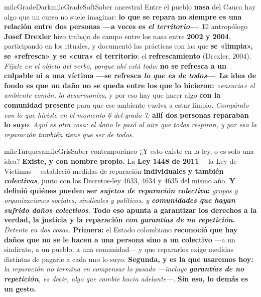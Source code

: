 \documentclass[11pt,letterpaper]{article}
\begin{document}
\begin{softbox}{milcGradeDark}{milcGradeSoft}{Saber ancestral}
Entre el pueblo \textbf{nasa} del Cauca hay algo que un curso no suele imaginar: \textbf{lo que se repara no siempre es una relación entre dos personas ---a veces es \emph{el territorio}---}. El antropólogo \textbf{Josef Drexler} hizo trabajo de campo entre los nasa entre \textbf{2002 y 2004}, participando en los rituales, y documentó las prácticas con las que \textbf{se «limpia», se «refresca» y se «cura» el territorio}: el \textbf{refrescamiento} (Drexler, 2004). \emph{Fíjate en el objeto del verbo, porque ahí está todo:} \textbf{no se refresca a un culpable ni a una víctima ---se refresca \emph{lo que es de todos}---}. \textbf{La idea de fondo es que un daño no se queda entre los que lo hicieron:} \emph{«ensucia» el ambiente común, lo desarmoniza}, y por eso hay que hacer algo \textbf{con la comunidad presente} para que ese ambiente vuelva a estar limpio. \emph{Compáralo con lo que hiciste en el momento 6 del grado 7:} \textbf{allí dos personas reparaban lo suyo}. \emph{Aquí es otra cosa: el daño le pasó al aire que todos respiran, y por eso la reparación también tiene que ser de todos.}
\end{softbox}

\begin{softbox}{milcTurquesa}{milcGris}{Saber contemporáneo}
¿Y esto existe en la ley, o es solo una idea? \textbf{Existe, y con nombre propio.} La \textbf{Ley 1448 de 2011} ---la Ley de Víctimas--- estableció medidas de reparación \textbf{individuales} \textbf{y también \emph{colectivas}}, junto con los Decretos-ley 4633, 4634 y 4635 del mismo año. \textbf{Y definió quiénes pueden ser \emph{sujetos de reparación colectiva}:} \emph{grupos y organizaciones sociales, sindicales y políticos, y \textbf{comunidades que hayan sufrido daños colectivos}}. \textbf{Todo eso apunta a garantizar los derechos a la verdad, la justicia y la reparación \emph{con garantías de no repetición}.} \emph{Detente en dos cosas.} \textbf{Primera:} el Estado colombiano \textbf{reconoció que hay daños que no se le hacen a una persona sino a un colectivo} ---a un sindicato, a un pueblo, a una comunidad--- y que repararlos exige medidas distintas de pagarle a cada uno lo suyo. \textbf{Segunda, y es la que usaremos hoy:} \emph{la reparación no termina en compensar lo pasado ---incluye \textbf{garantías de no repetición}, es decir, algo que cambie hacia adelante---}. \textbf{Sin eso, lo demás es un gesto.}
\end{softbox}
\end{document}
